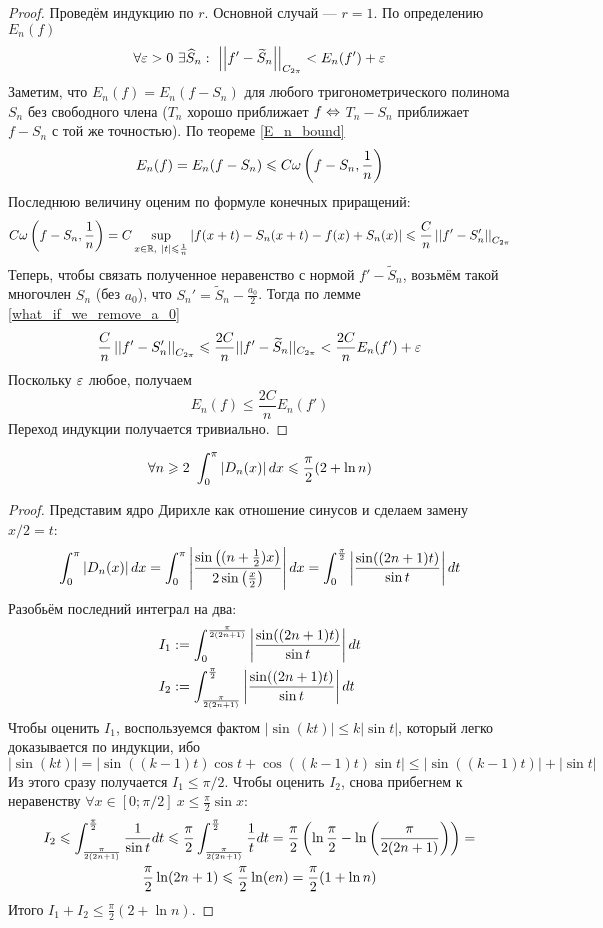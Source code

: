 \begin{proof}
	Проведём индукцию по $r$. Основной случай --- $r = 1$. По определению $E_n(f)$
	\[
		\forall \varepsilon > 0 \ \exists \widehat S_n : \ \left|\left|f' - \widetilde S_n\right|\right|_{C_{2\pi}} < E_n(f') + \varepsilon
	\]
	Заметим, что $E_n(f) = E_n(f - S_n)$ для любого тригонометрического полинома $S_n$ без свободного члена ($T_n$ хорошо приближает $f \Leftrightarrow$ $T_n - S_n$ приближает $f - S_n$ с той же точностью). По теореме \ref{E_n_bound}
	\[
		E_n(f) = E_n(f - S_n) \leqslant C\omega\left(f - S_n, \frac{1}{n}\right)
	\]
	Последнюю величину оценим по формуле конечных приращений:
	\[
		C\omega\left(f - S_n, \frac{1}{n}\right) = C \sup_{x \in \mathbb{R}, \ |t| \leqslant \frac{1}{n}} |f(x+t) - S_n(x+t) - f(x) + S_n(x)| \leqslant \frac{C}{n} \left|\left|f' - S_n'\right|\right|_{C_{2\pi}}
	\]
	Теперь, чтобы связать полученное неравенство с нормой $f' - \widetilde S_n$, возьмём такой многочлен $S_n$ (без $a_0$), что $S_n' = \widetilde S_n - \frac{a_0}{2}$. Тогда по лемме \ref{what_if_we_remove_a_0}
	\[
		\frac{C}{n} \left|\left|f' - S_n'\right|\right|_{C_{2\pi}} \leqslant \frac{2C}{n} ||f' - \widetilde S_n||_{C_{2\pi}} < \frac{2C}{n} E_n(f') + \varepsilon
	\]
	Поскольку $\varepsilon$ любое, получаем
	\[
		E_n(f) \leq \frac{2C}{n} E_n(f')
	\]
	Переход индукции получается тривиально.
\end{proof}

\begin{lemma}
	\[
		\forall n \geqslant 2 \ \int_0^\pi \left|D_n(x)\right|dx \leqslant \frac{\pi}{2}(2 + \ln n)
	\]
\end{lemma}

\begin{proof}
	Представим ядро Дирихле как отношение синусов и сделаем замену $x/2 = t$:
	\[
		\int_0^\pi \left|D_n(x)\right|dx = \int_0^\pi \left|\frac{\sin\left((n + \frac{1}{2})x\right)}{2\sin\left(\frac{x}{2}\right)}\right|dx = \int_0^{\frac{\pi}{2}} \left|\frac{\sin((2n+1)t)}{\sin t}\right|dt
	\]
	Разобьём последний интеграл на два:
	\begin{align*}
		&I_1 := \int_0^{\frac{\pi}{2(2n+1)}} \left|\frac{\sin((2n+1)t)}{\sin t}\right|dt \\
		&I_2 := \int_{\frac{\pi}{2(2n+1)}}^{\frac{\pi}{2}} \left|\frac{\sin((2n+1)t)}{\sin t}\right|dt
	\end{align*}
	Чтобы оценить $I_1$, воспользуемся фактом $|\sin(kt)| \leq k|\sin t|$, который легко доказывается по индукции, ибо
	\[
		|\sin(kt)| = |\sin((k-1)t)\cos t + \cos((k-1)t)\sin t| \leq |\sin((k-1)t)| + |\sin t|
	\]
	Из этого сразу получается $I_1 \leq \pi/2$.
	Чтобы оценить $I_2$, снова прибегнем к неравенству $\forall x \in [0; \pi/2] \ x \leq \frac{\pi}{2}\sin x$:
	\begin{multline*}
		I_2 \leqslant \int_{\frac{\pi}{2(2n+1)}}^{\frac{\pi}{2}} \frac{1}{\sin t}dt \leqslant \frac{\pi}{2} \int_{\frac{\pi}{2(2n+1)}}^{\frac{\pi}{2}} \frac{1}{t}dt = \frac{\pi}{2} \left(\ln\frac{\pi}{2} - \ln\left(\frac{\pi}{2(2n+1)}\right)\right) = \\
		\frac{\pi}{2} \ln(2n + 1) \leqslant \frac{\pi}{2} \ln(en) = \frac{\pi}{2}(1 + \ln n)
	\end{multline*}
	Итого $I_1 + I_2 \leq \frac{\pi}{2}(2 + \ln n)$.
\end{proof}

